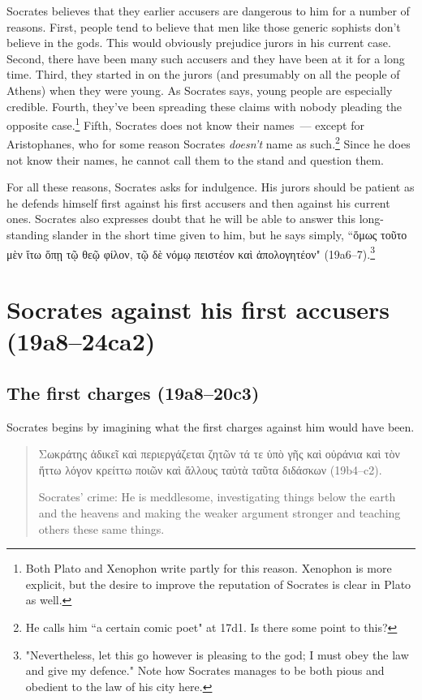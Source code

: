\documentclass[11pt]{article}
\begin{document}
Socrates believes that they earlier accusers are dangerous to him for
a number of reasons.  First, people tend to believe that men like those
generic sophists don't believe in the gods.  This would obviously prejudice
jurors in his current case.  Second, there have been many such accusers and
they have been at it for a long time.  Third, they started in on the jurors
(and presumably on all the people of Athens) when they were young.  As
Socrates says, young people are especially credible.  Fourth, they've been
spreading these claims with nobody pleading the opposite case.\footnote{Both
Plato and Xenophon write partly for this reason.  Xenophon is more explicit,
but the desire to improve the reputation of Socrates is clear in Plato as
well.}  Fifth, Socrates does not know their names~--- except for
Aristophanes, who for some reason Socrates \emph{doesn't} name as
such.\footnote{He calls him ``a certain comic poet" at 17d1.  Is there some
point to this?}  Since he does not know their names, he cannot call them to
the stand and question them.

For all these reasons, Socrates asks for indulgence.  His jurors should be
patient as he defends himself first against his first accusers and then
against his current ones.  Socrates also expresses doubt that he will be
able to answer this long-standing slander in the short time given to him,
but he says simply, ``ὅμως τοῦτο μὲν ἴτω ὅπῃ τῷ θεῷ φίλον, τῷ δὲ νόμῳ
πειστέον καὶ ἀπολογητέον" (19a6--7).\footnote{"Nevertheless, let this go
however is pleasing to the god; I must obey the law and give my defence."
Note how Socrates manages to be both pious and obedient to the law of his
city here.}

\section{Socrates against his first accusers (19a8--24ca2)}

\subsection{The first charges (19a8--20c3)}

Socrates begins by imagining what the first charges against him would have
been.

\begin{quote}
    Σωκράτης ἀδικεῖ καὶ περιεργάζεται ζητῶν τά τε ὑπὸ γῆς καὶ οὐράνια καὶ
    τὸν ἥττω λόγον κρείττω ποιῶν καὶ ἄλλους ταὐτὰ ταῦτα διδάσκων
    (19b4--c2).

    Socrates' crime: He is meddlesome, investigating things below the earth
    and the heavens and making the weaker argument stronger and teaching
    others these same things.
\end{quote}
\end{document}
